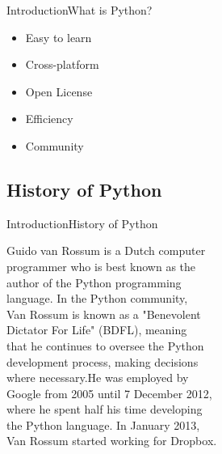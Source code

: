 \documentclass[10pt]{beamer}
\begin{document}
\begin{frame}{Introduction}{What is Python?}
\begin{itemize}
	\item Easy to learn
	\item Cross-platform
	\item Open License
	\item Efficiency
	\item Community
\end{itemize}	
\end{frame}
 		
 \subsection{History of Python}
 \begin{frame}{Introduction}{History of Python}
	 	
		Guido van Rossum is a Dutch computer \\ 
 		programmer who is best known as the \\
 		author of the Python programming \\
 		language. In the Python community, \\
 		Van Rossum is known as a "Benevolent \\
 		Dictator For Life" (BDFL), meaning \\
 		that he continues to oversee the Python\\
 		development process, making decisions \\
 		where necessary.He was employed by \\
 		Google from 2005 until 7 December 2012,\\
 		where he spent half his time developing \\
 		the Python language. In January 2013, \\
 		Van Rossum started working for Dropbox.
\end{frame}
 		
\end{document}
